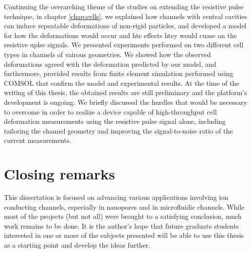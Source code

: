 		Continuing the overarching theme of the studies on extending the resistive pulse technique, in chapter \ref{chap:cells}, we explained how channels with central cavities can induce repeatable deformations of non-rigid particles, and developed a model for how the deformations would occur and hte effects htey would cuase on the resistive uplse signals. We presented experiments performed on two different cell types in channels of vairous geometries. We showed how the observed deformations agreed with the deformation predicted by our model, and furthermore, provided results from finite element simulation performed using COMSOL that confirm the model and experimental results. At the time of the writing of this thesis, the obtained results are still preliminary and the platform's development is ongoing. We briefly discussed the hurdles that would be necessary to overcome in order to realize a device capable of high-throughput cell deformation measurements using the resistive pulse signal alone, including tailoring the channel geometry and improving the signal-to-noise ratio of the current measurements.
		
		
\section{Closing remarks}
      
	This dissertation is focused on advancing various applications involving ion conducting channels, especially in nanopores and in microfluidic channels. While most of the projects (but not all) were brought to a satisfying conclusion, much work remains to be done. It is the author's hope that future graduate students interested in one or more of the subjects presented will be able to use this thesis as a starting point and develop the ideas further.
	
		




			
			
			

			
			
			
			

			
			


			
	





